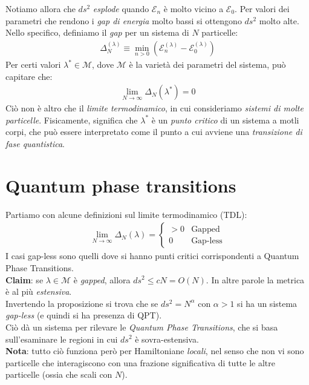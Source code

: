 \documentclass[../../InformazioneQuantistica.tex]{subfiles}
\begin{document}
Notiamo allora che $ds^2$ \textit{esplode} quando $\mathcal{E}_n$ è molto vicino a $\mathcal{E}_0$. Per valori dei parametri che rendono i \textit{gap di energia} molto bassi si ottengono $ds^2$ molto alte. Nello specifico, definiamo il \textit{gap} per un sistema di $N$ particelle:
\begin{align*}
\Delta_N^{(\lambda)} \equiv \min_{n>0} (\mathcal{E}_n^{(\lambda)} - \mathcal{E}_0^{(\lambda)}) 
\end{align*}
Per certi valori $\lambda^* \in \mathcal{M}$, dove $\mathcal{M}$ è la varietà dei parametri del sistema, può capitare che:
\begin{align*}
\lim_{N \to \infty} \Delta_N (\lambda^*) = 0
\end{align*}
Ciò non è altro che il \textit{limite termodinamico}, in cui consideriamo \textit{sistemi di molte particelle}. Fisicamente, significa che $\lambda^*$ è un \textit{punto critico} di un sistema a motli corpi, che può essere interpretato come il punto a cui avviene una \textit{transizione di fase quantistica}.

\section{Quantum phase transitions}
Partiamo con alcune definizioni sul limite termodinamico (TDL):
\begin{align*}
\lim_{N\to \infty} \Delta_N(\lambda) = \begin{cases}
> 0 & \text{Gapped}\\
0 & \text{Gap-less}
\end{cases}
\end{align*}
I casi gap-less sono quelli dove si hanno punti critici corrispondenti a Quantum Phase Transitions.\\

\textbf{Claim}: se $\lambda \in \mathcal{M}$ è \textit{gapped}, allora $ds^2 \leq cN = O(N)$. In altre parole la metrica è al più \textit{estensiva}.\\
Invertendo la proposizione si trova che se $ds^2 = N^\alpha$ con $\alpha > 1$ si ha un sistema \textit{gap-less} (e quindi si ha presenza di QPT).\\
Ciò dà un sistema per rilevare le \textit{Quantum Phase Transitions}, che si basa sull'esaminare le regioni in cui $ds^2$ è sovra-estensiva.\\

\textbf{Nota}: tutto ciò funziona però per Hamiltoniane \textit{locali}, nel senso che non vi sono particelle che interagiscono con una frazione significativa di tutte le altre particelle (ossia che scali con $N$).\\
\end{document}

